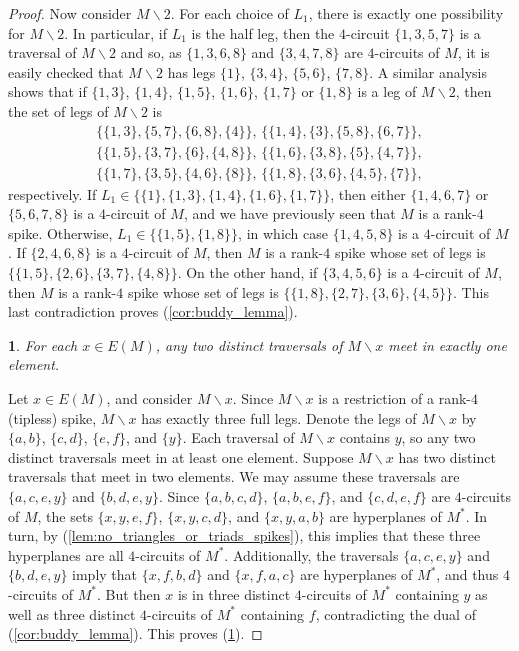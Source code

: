 \documentclass[11pt]{amsart}
\newtheorem{sublemma}{}[theorem]
\numberwithin{equation}{section} %
\begin{document}
\begin{proof}
Now consider $M\backslash 2$. For each choice of $L_1$, there is exactly one possibility for $M\backslash 2$. In particular, if $L_1$ is the half leg, then the $4$-circuit $\{1, 3, 5, 7\}$ is a traversal of $M\backslash 2$ and so, as $\{1, 3, 6, 8\}$ and $\{3, 4, 7, 8\}$ are $4$-circuits of $M$, it is easily checked that $M\backslash 2$ has legs $\{1\}$, $\{3, 4\}$, $\{5, 6\}$, $\{7, 8\}$. A similar analysis shows that if $\{1, 3\}$, $\{1, 4\}$, $\{1, 5\}$, $\{1, 6\}$, $\{1, 7\}$ or $\{1, 8\}$ is a leg of $M\backslash 2$, then the set of legs of $M\backslash 2$ is
\begin{align*}
\{\{1, 3\}, \{5, 7\}, \{6, 8\}, \{4\}\},\, \{\{1, 4\}, \{3\}, \{5, 8\}, \{6, 7\}\}, \\
\{\{1, 5\}, \{3, 7\}, \{6\}, \{4, 8\}\},\, \{\{1, 6\}, \{3, 8\}, \{5\}, \{4, 7\}\}, \\
\{\{1, 7\}, \{3, 5\}, \{4, 6\}, \{8\}\},\, \{\{1, 8\}, \{3, 6\}, \{4, 5\}, \{7\}\},
\end{align*}
respectively. If $L_1\in \{\{1\}, \{1, 3\}, \{1, 4\}, \{1, 6\}, \{1, 7\}\}$, then either $\{1, 4, 6, 7\}$ or $\{5, 6, 7, 8\}$ is a $4$-circuit of $M$, and we have previously seen that $M$ is a rank-$4$ spike. Otherwise, $L_1\in \{\{1, 5\}, \{1, 8\}\}$, in which case $\{1, 4, 5, 8\}$ is a $4$-circuit of $M$. If $\{2, 4, 6, 8\}$ is a $4$-circuit of $M$, then $M$ is a rank-$4$ spike whose set of legs is $\{\{1, 5\}, \{2, 6\}, \{3, 7\}, \{4, 8\}\}$. On the other hand, if $\{3, 4, 5, 6\}$ is a $4$-circuit of $M$, then $M$ is a rank-$4$ spike whose set of legs is $\{\{1, 8\}, \{2, 7\}, \{3, 6\}, \{4, 5\}\}$. This last contradiction proves (\ref{cor:buddy_lemma}).

\begin{sublemma}
\label{lem:unique_traversal_intersection}
For each $x \in E(M)$, any two distinct traversals of $M\backslash x$ meet in exactly one element.
\end{sublemma}

Let $x\in E(M)$, and consider $M\backslash x$. Since $M\backslash x$ is a restriction of a rank-$4$ (tipless) spike, $M\backslash x$ has exactly three full legs. Denote the legs of $M\backslash x$ by $\{a, b\}$, $\{c, d\}$, $\{e, f\}$, and $\{y\}$. Each traversal of $M \backslash x$ contains $y$, so any two distinct traversals meet in at least one element. Suppose $M \backslash x$ has two distinct traversals that meet in two elements. We may assume these traversals are $\{a,c,e,y\}$ and $\{b,d,e,y\}$. Since $\{a, b, c, d\}$, $\{a, b, e, f\}$, and $\{c, d, e, f\}$ are $4$-circuits of $M$, the sets $\{x, y, e, f\}$, $\{x, y, c, d\}$, and $\{x, y, a, b\}$ are hyperplanes of $M^*$. In turn, by (\ref{lem:no_triangles_or_triads_spikes}), this implies that these three hyperplanes are all $4$-circuits of $M^*$. Additionally, the traversals $\{a,c,e,y\}$ and $\{b,d,e,y\}$ imply that $\{x, f, b, d\}$ and $\{x, f, a, c\}$ are hyperplanes of $M^*$, and thus $4$-circuits of $M^*$. But then $x$ is in three distinct $4$-circuits of $M^*$ containing $y$ as well as three distinct $4$-circuits of $M^*$ containing $f$, contradicting the dual of (\ref{cor:buddy_lemma}). This proves (\ref{lem:unique_traversal_intersection}).


\end{proof}
\end{document}
